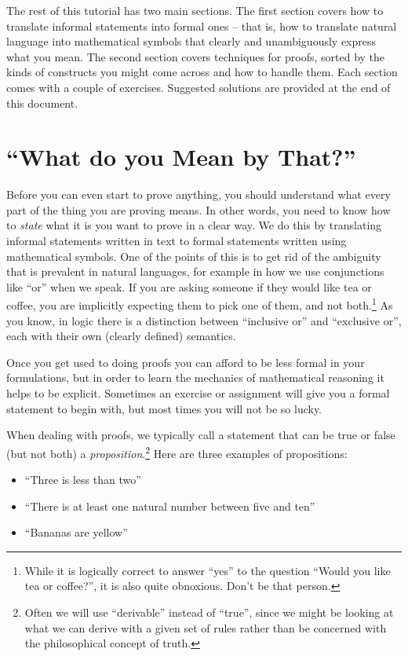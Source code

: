 \documentclass{tufte-handout}
\newcounter{example}
\newcounter{exc:first:proof}
\begin{document}
The rest of this tutorial has two main sections.
%
The first section covers how to translate informal statements into
formal ones -- that is, how to translate natural language into
mathematical symbols that clearly and unambiguously express what
you mean.
%
The second section covers techniques for proofs, sorted by the
kinds of constructs you might come across and how to handle them.
%
%
Each section comes with a couple of exercises. Suggested solutions
are provided at the end of this document.

\section{``What do you Mean by That?''}

Before you can even start to prove anything, you should understand
what every part of the thing you are proving means. In other
words, you need to know how to \emph{state} what it is you want to
prove in a clear way. We do this by translating informal
statements written in text to formal statements written using
mathematical symbols.
%
One of the points of this is to get rid of the ambiguity that is
prevalent in natural languages, for example in how we use
conjunctions like ``or'' when we speak. If you are asking someone
if they would like tea or coffee, you are implicitly expecting
them to pick one of them, and not both.\footnote{While it is
  logically correct to answer ``yes'' to the question ``Would you
  like tea or coffee?'', it is also quite obnoxious. Don't be that
  person. } As you know, in logic there is a distinction between
``inclusive or'' and ``exclusive or'', each with their own
(clearly defined) semantics.

Once you get used to doing proofs you can afford to be less formal
in your formulations, but in order to learn the mechanics of
mathematical reasoning it helps to be explicit.
%
Sometimes an exercise or assignment will give you a formal
statement to begin with, but most times you will not be so lucky.

When dealing with proofs, we typically call a statement that can
be true or false (but not both) a
\emph{proposition}.\footnote{Often we will use ``derivable''
  instead of ``true'', since we might be looking at what we can
  derive with a given set of rules rather than be concerned with
  the philosophical concept of truth. } Here are three examples
of propositions:
\begin{itemize}
\item ``Three is less than two''
\item ``There is at least one natural number between five
and ten''
\item ``Bananas are yellow''
\end{itemize}
\end{document}
